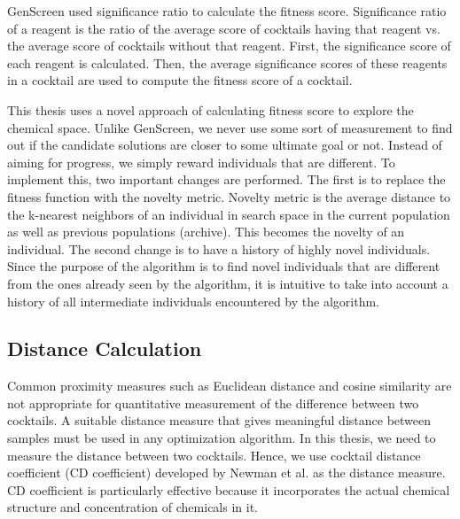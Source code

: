 GenScreen used significance ratio 
\cite{OptimizeAED} to calculate the fitness score. Significance ratio of a reagent is the ratio of the average score of cocktails having that reagent vs. the average score of cocktails without that reagent\cite{SamyamThesis}.
First, the significance score of each reagent is calculated. Then, the average significance scores  of these reagents in a cocktail are used to compute the fitness score of a cocktail.

This thesis uses a novel approach of calculating fitness score to explore the chemical space. Unlike GenScreen, we never use some sort of measurement to find out if the candidate solutions are closer to some ultimate goal or not. Instead of aiming for progress, we simply reward individuals that are different. To implement this, two important changes are performed. The first is to replace the fitness function with the novelty metric. Novelty metric is the average distance to the k-nearest neighbors of an individual in search space in the current population as well as previous populations (archive). This becomes the novelty of an individual. The second change is to have a history of highly novel individuals. Since the purpose of the algorithm is to find novel individuals that are different from the ones already seen by the algorithm, it is intuitive to take into account a history of all intermediate individuals encountered by the algorithm.


\subsection{Distance Calculation} \label{sec:GA-fitness-k}

Common proximity measures such as Euclidean distance and cosine similarity are not appropriate for quantitative measurement of the difference between two cocktails. %
A suitable distance measure that gives meaningful distance between samples must be used in any optimization algorithm.
In this thesis, we need to measure the distance between two cocktails. Hence, we use cocktail distance coefficient (CD coefficient) developed by Newman et al.\cite{Newman} as the distance measure. CD coefficient is particularly effective because it incorporates the actual chemical structure and concentration of chemicals in it. 

